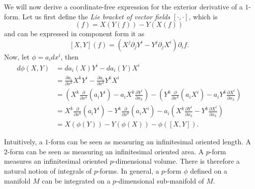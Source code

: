 We will now derive a coordinate-free expression for the exterior derivative of a $1$-form. Let us first define the \textit{Lie bracket of vector fields} $[\cdot, \cdot]$, which is
\begin{equation}
	[X, Y](f) = X(Y(f)) - Y(X(f)) 
\end{equation}
and can be expressed in component form it as \citep{misnerGravitation2017}
\begin{equation} \label{eq:lie bracket in component form}
[X, Y](f) = (X^j \partial_j Y^i - Y^j \partial_j X^i) \partial_i f.
\end{equation}
Now, let $\phi = a_i dx^i$, then
\begin{equation} \label{eq:exterior derivative of 1-form evaluated}
\begin{aligned}
d\phi(X,Y) & = da_i(X) Y^i - da_i(Y) X^i \\
 & = \frac{\partial a_i}{\partial x^k} X^k Y^i - \frac{\partial a_i}{\partial x^k} Y^k X^i \\
 & =  \left( X^k \frac{\partial}{\partial x^k} ( a_i Y^i) - a_i X^k \frac{\partial Y^i}{\partial x_k} \right) -  \left( Y^k \frac{\partial}{\partial x^k} ( a_i X^i) - a_i Y^k \frac{\partial X^i}{\partial x_k} \right) \\
 & = X^k \frac{\partial}{\partial x^k} ( a_i Y^i) - Y^k \frac{\partial}{\partial x^k} ( a_i X^i) - a_i  \left( X^k \frac{\partial Y^i}{\partial x_k} - Y^k \frac{\partial X^i}{\partial x_k} \right) \\
 & = X(\phi(Y)) - Y(\phi(X)) - \phi([X,Y]).
\end{aligned}
\end{equation}

Intuitively, a $1$-form can be seen as measuring an infinitesimal oriented length. A $2$-form can be seen as measuring an infinitesimal oriented area. A $p$-form measures an infinitesimal oriented $p$-dimensional volume. There is therefore a natural notion of integrals of $p$-forms. In general, a $p$-form $\phi$ defined on a manifold $M$ can be integrated on a $p$-dimensional sub-manifold of $M$.

